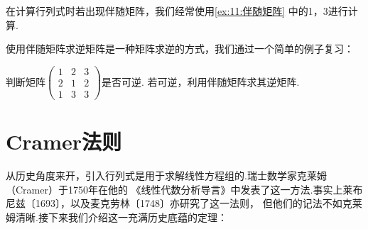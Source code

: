 在计算行列式时若出现伴随矩阵，我们经常使用\autoref{ex:11:伴随矩阵} 中的1，3进行计算.

使用伴随矩阵求逆矩阵是一种矩阵求逆的方式，我们通过一个简单的例子复习：
\begin{example}
    判断矩阵$\begin{pmatrix}
        1 & 2 & 3 \\ 2 & 1 & 2 \\ 1 & 3 & 3
    \end{pmatrix}$是否可逆. 若可逆，利用伴随矩阵求其逆矩阵.
\end{example}
\begin{solution}

\end{solution}

\section{Cramer法则}
从历史角度来开，引入行列式是用于求解线性方程组的.瑞士数学家克莱姆（Cramer）于1750年在他的
《线性代数分析导言》中发表了这一方法.事实上莱布尼兹〔1693〕，以及麦克劳林〔1748〕亦研究了这一法则，
但他们的记法不如克莱姆清晰.接下来我们介绍这一充满历史底蕴的定理：
